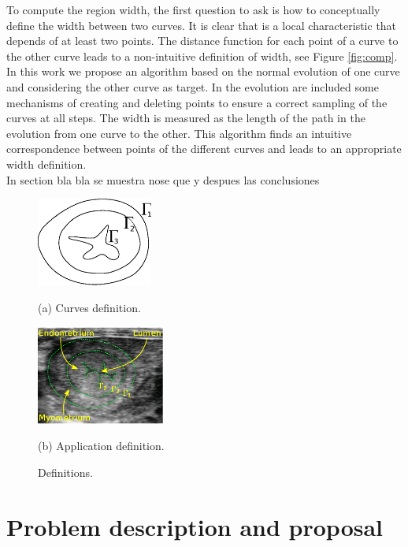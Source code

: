 \documentclass{article}
\begin{document}
To compute the region width, the first question to ask is how to conceptually define the width between two curves. It is clear that is a local characteristic that depends of at least two points. The distance function for each point of a curve to the other curve leads to a non-intuitive definition of width, see Figure \ref{fig:comp}. In this work we propose an algorithm based on the normal evolution of one curve and considering the other curve as target. In the evolution are included some mechanisms of creating and deleting points to ensure a correct sampling of the curves at all steps. The width is measured as the length of the path in the evolution from one curve to the other. This algorithm finds an intuitive correspondence between points of the different curves and leads to an appropriate width definition.\\

In section bla bla se muestra nose que y despues las conclusiones

\begin{figure}[t]
\begin{minipage}[b]{.45\linewidth}
  \centering
  \centerline{\includegraphics[width=3.8cm]{pics/defs2}}
  \centerline{(a) Curves definition.}\medskip
\end{minipage}\hfill
\begin{minipage}[b]{.52\linewidth}
  \centering
  \centerline{\includegraphics[width=4.2cm]{pics/defsEndo}}
  \centerline{(b) Application definition.}\medskip
\end{minipage}
\caption{Definitions.}
\label{fig:defs}
\end{figure}

\section{Problem description and proposal}
\label{sec:proposal}
\end{document}
